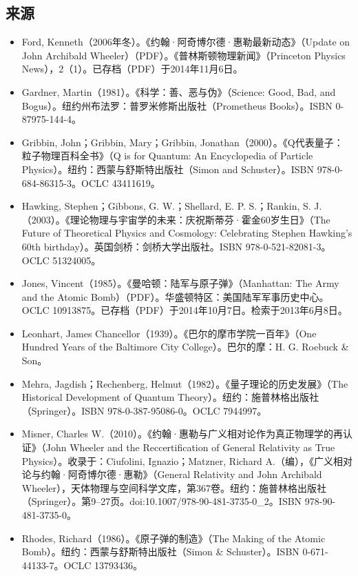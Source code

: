 \subsection{来源}
\begin{itemize}
\item Ford, Kenneth（2006年冬）。《约翰·阿奇博尔德·惠勒最新动态》（Update on John Archibald Wheeler）（PDF）。《普林斯顿物理新闻》（Princeton Physics News），2（1）。已存档（PDF）于2014年11月6日。
\item Gardner, Martin（1981）。《科学：善、恶与伪》（Science: Good, Bad, and Bogus）。纽约州布法罗：普罗米修斯出版社（Prometheus Books）。ISBN 0-87975-144-4。
\item Gribbin, John；Gribbin, Mary；Gribbin, Jonathan（2000）。《Q代表量子：粒子物理百科全书》（Q is for Quantum: An Encyclopedia of Particle Physics）。纽约：西蒙与舒斯特出版社（Simon and Schuster）。ISBN 978-0-684-86315-3。OCLC 43411619。
\item Hawking, Stephen；Gibbons, G. W.；Shellard, E. P. S.；Rankin, S. J.（2003）。《理论物理与宇宙学的未来：庆祝斯蒂芬·霍金60岁生日》（The Future of Theoretical Physics and Cosmology: Celebrating Stephen Hawking's 60th birthday）。英国剑桥：剑桥大学出版社。ISBN 978-0-521-82081-3。OCLC 51324005。
\item Jones, Vincent（1985）。《曼哈顿：陆军与原子弹》（Manhattan: The Army and the Atomic Bomb）（PDF）。华盛顿特区：美国陆军军事历史中心。OCLC 10913875。已存档（PDF）于2014年10月7日。检索于2013年6月8日。
\item Leonhart, James Chancellor（1939）。《巴尔的摩市学院一百年》（One Hundred Years of the Baltimore City College）。巴尔的摩：H. G. Roebuck & Son。
\item Mehra, Jagdish；Rechenberg, Helmut（1982）。《量子理论的历史发展》（The Historical Development of Quantum Theory）。纽约：施普林格出版社（Springer）。ISBN 978-0-387-95086-0。OCLC 7944997。
\item Misner, Charles W.（2010）。《约翰·惠勒与广义相对论作为真正物理学的再认证》（John Wheeler and the Reccertification of General Relativity as True Physics）。收录于：Ciufolini, Ignazio；Matzner, Richard A.（编），《广义相对论与约翰·阿奇博尔德·惠勒》（General Relativity and John Archibald Wheeler），天体物理与空间科学文库，第367卷。纽约：施普林格出版社（Springer）。第9–27页。doi:10.1007/978-90-481-3735-0\_2。ISBN 978-90-481-3735-0。
\item Rhodes, Richard（1986）。《原子弹的制造》（The Making of the Atomic Bomb）。纽约：西蒙与舒斯特出版社（Simon & Schuster）。ISBN 0-671-44133-7。OCLC 13793436。

\end{itemize}
